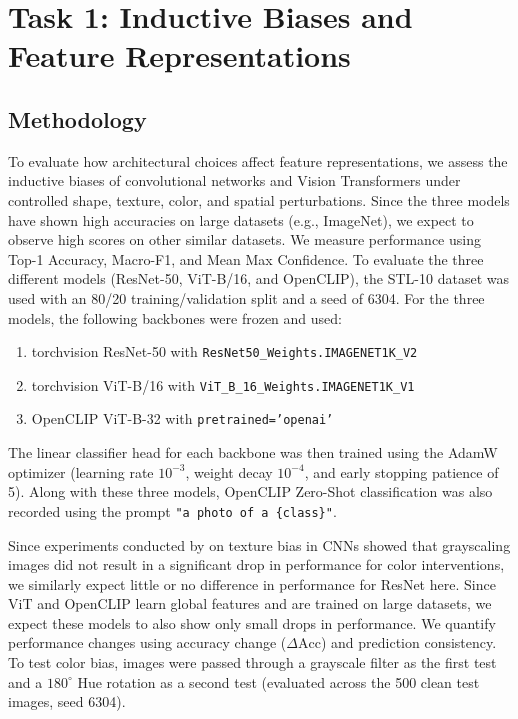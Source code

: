 \documentclass{article}
\begin{document}
\section{Task 1: Inductive Biases and Feature Representations}
\label{sec:task1}

\subsection{Methodology}
To evaluate how architectural choices affect feature representations, we assess the inductive biases of convolutional networks and Vision Transformers under controlled shape, texture, color, and spatial perturbations. Since the three models have shown high accuracies on large datasets (e.g., ImageNet), we expect to observe high scores on other similar datasets. We measure performance using Top-1 Accuracy, Macro-F1, and Mean Max Confidence. To evaluate the three different models (ResNet-50, ViT-B/16, and OpenCLIP), the STL-10 dataset was used with an 80/20 training/validation split and a seed of 6304. For the three models, the following backbones were frozen and used:
\begin{enumerate}
    \item torchvision ResNet-50 with \texttt{ResNet50\_Weights.IMAGENET1K\_V2}
    \item torchvision ViT-B/16 with \texttt{ViT\_B\_16\_Weights.IMAGENET1K\_V1}
    \item OpenCLIP ViT-B-32 with \texttt{pretrained='openai'}
\end{enumerate}
The linear classifier head for each backbone was then trained using the AdamW optimizer (learning rate $10^{-3}$, weight decay $10^{-4}$, and early stopping patience of 5). Along with these three models, OpenCLIP Zero-Shot classification was also recorded using the prompt \texttt{"a photo of a \{class\}"}.

Since experiments conducted by \citet{geirhos2019imagenet} on texture bias in CNNs showed that grayscaling images did not result in a significant drop in performance for color interventions, we similarly expect little or no difference in performance for ResNet here. Since ViT and OpenCLIP learn global features and are trained on large datasets, we expect these models to also show only small drops in performance. We quantify performance changes using accuracy change ($\Delta \text{Acc}$) and prediction consistency. To test color bias, images were passed through a grayscale filter as the first test and a $180^\circ$ Hue rotation as a second test (evaluated across the 500 clean test images, seed 6304).
\end{document}
